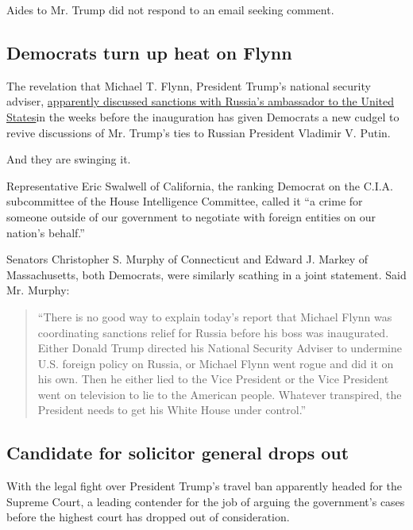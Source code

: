 Aides to Mr. Trump did not respond to an email seeking comment.

\hypertarget{democrats-turn-up-heat-on-flynn}{%
\subsection{Democrats turn up heat on
Flynn}\label{democrats-turn-up-heat-on-flynn}}

The revelation that Michael T. Flynn, President Trump's national
security adviser,
\href{https://www.nytimes.com/2017/02/09/us/flynn-is-said-to-have-talked-to-russians-about-sanctions-before-trump-took-office.html?_r=0}{apparently
discussed sanctions with Russia's ambassador to the United States}in the
weeks before the inauguration has given Democrats a new cudgel to revive
discussions of Mr. Trump's ties to Russian President Vladimir V. Putin.

And they are swinging it.

Representative Eric Swalwell of California, the ranking Democrat on the
C.I.A. subcommittee of the House Intelligence Committee, called it ``a
crime for someone outside of our government to negotiate with foreign
entities on our nation's behalf.''

Senators Christopher S. Murphy of Connecticut and Edward J. Markey of
Massachusetts, both Democrats, were similarly scathing in a joint
statement. Said Mr. Murphy:

\begin{quote}
``There is no good way to explain today's report that Michael Flynn was
coordinating sanctions relief for Russia before his boss was
inaugurated. Either Donald Trump directed his National Security Adviser
to undermine U.S. foreign policy on Russia, or Michael Flynn went rogue
and did it on his own. Then he either lied to the Vice President or the
Vice President went on television to lie to the American people.
Whatever transpired, the President needs to get his White House under
control.''
\end{quote}

\hypertarget{candidate-for-solicitor-general-drops-out}{%
\subsection{Candidate for solicitor general drops
out}\label{candidate-for-solicitor-general-drops-out}}

With the legal fight over President Trump's travel ban apparently headed
for the Supreme Court, a leading contender for the job of arguing the
government's cases before the highest court has dropped out of
consideration.

